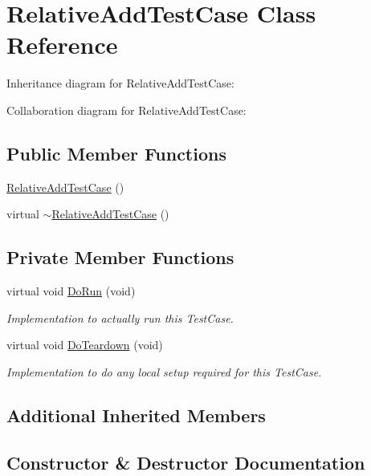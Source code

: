 \hypertarget{classRelativeAddTestCase}{}\section{Relative\+Add\+Test\+Case Class Reference}
\label{classRelativeAddTestCase}


Inheritance diagram for Relative\+Add\+Test\+Case\+:


Collaboration diagram for Relative\+Add\+Test\+Case\+:
\subsection*{Public Member Functions}
\begin{DoxyCompactItemize}
\item 
\hyperlink{classRelativeAddTestCase_af7f97754cfd5b886684a757a4ba8fda8}{Relative\+Add\+Test\+Case} ()
\item 
virtual \hyperlink{classRelativeAddTestCase_a20a22f21c26f9edad0766de22750dc20}{$\sim$\+Relative\+Add\+Test\+Case} ()
\end{DoxyCompactItemize}
\subsection*{Private Member Functions}
\begin{DoxyCompactItemize}
\item 
virtual void \hyperlink{classRelativeAddTestCase_af4a41ae77fc8d7e1a8f936daa3be70f0}{Do\+Run} (void)
\begin{DoxyCompactList}\small\item\em Implementation to actually run this Test\+Case. \end{DoxyCompactList}\item 
virtual void \hyperlink{classRelativeAddTestCase_a8a59b36640def12d4ca46533449ebb4a}{Do\+Teardown} (void)
\begin{DoxyCompactList}\small\item\em Implementation to do any local setup required for this Test\+Case. \end{DoxyCompactList}\end{DoxyCompactItemize}
\subsection*{Additional Inherited Members}


\subsection{Constructor \& Destructor Documentation}
